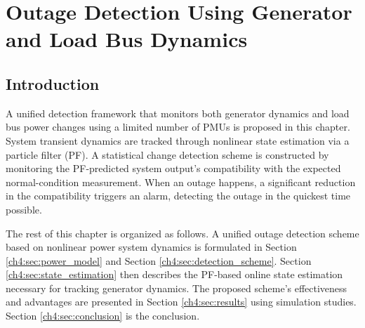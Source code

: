 

\chapter{Outage Detection Using Generator and Load Bus Dynamics} %
\label{ch:detection_using_generator_dynamics}


\section{Introduction} %
\label{ch4:sec:introduction}

A unified detection framework that monitors both generator dynamics and load bus power changes using a limited number of PMUs is proposed in this chapter. System transient dynamics are tracked through nonlinear state estimation via a particle filter (PF). A statistical change detection scheme is constructed by monitoring the PF-predicted system output's compatibility with the expected normal-condition measurement. When an outage happens, a significant reduction in the compatibility triggers an alarm, detecting the outage in the quickest time possible. 

The rest of this chapter is organized as follows. A unified outage detection scheme based on nonlinear power system dynamics is formulated in Section \ref{ch4:sec:power_model} and Section \ref{ch4:sec:detection_scheme}. Section \ref{ch4:sec:state_estimation} then describes the PF-based online state estimation necessary for tracking generator dynamics. The proposed scheme's effectiveness and advantages are presented in Section \ref{ch4:sec:results} using simulation studies. Section \ref{ch4:sec:conclusion} is the conclusion.



